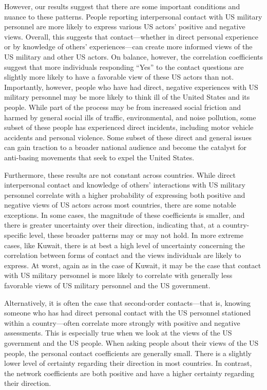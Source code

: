 However, our results suggest that there are some important conditions and nuance to these patterns. People reporting interpersonal contact with US military personnel are more likely to express various US actors' positive and negative views. Overall, this suggests that contact---whether in direct personal experience or by knowledge of others' experiences---can create more informed views of the US military and other US actors. On balance, however, the correlation coefficients suggest that more individuals responding ``Yes'' to the contact questions are slightly more likely to have a favorable view of these US actors than not. Importantly, however, people who have had direct, negative experiences with US military personnel may be more likely to think ill of the United States and its people. While part of the process may be from increased social friction and harmed by general social ills of traffic, environmental, and noise pollution, some subset of these people has experienced direct incidents, including motor vehicle accidents and personal violence. Some subset of these direct and general issues can gain traction to a broader national audience and become the catalyst for anti-basing movements that seek to expel the United States.

Furthermore, these results are not constant across countries. While direct interpersonal contact and knowledge of others' interactions with US military personnel correlate with a higher probability of expressing both positive and negative views of US actors across most countries, there are some notable exceptions. In some cases, the magnitude of these coefficients is smaller, and there is greater uncertainty over their direction, indicating that, at a country-specific level, these broader patterns may or may not hold. In more extreme cases, like Kuwait, there is at best a high level of uncertainty concerning the correlation between forms of contact and the views individuals are likely to express. At worst, again as in the case of Kuwait, it may be the case that contact with US military personnel is more likely to correlate with generally less favorable views of US military personnel and the US government. 

Alternatively, it is often the case that second-order contacts---that is, knowing someone who has had direct personal contact with the US personnel stationed within a country---often correlate more strongly with positive and negative assessments. This is especially true when we look at the views of the US government and the US people. When asking people about their views of the US people, the personal contact coefficients are generally small. There is a slightly lower level of certainty regarding their direction in most countries. In contrast, the network coefficients are both positive and have a higher certainty regarding their direction.

